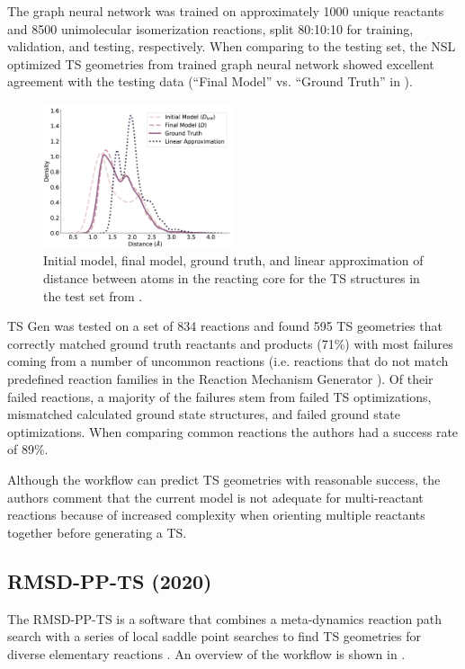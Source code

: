 \documentclass[preprint, 11pt]{elsarticle} %
\begin{document}
The graph neural network was trained on approximately 1000 unique reactants and 8500 unimolecular isomerization reactions, split 80:10:10 for training, validation, and testing, respectively.
When comparing to the testing set, the NSL optimized TS geometries from trained graph neural network showed excellent agreement with the testing data (``Final Model'' vs. ``Ground Truth'' in ). 

\begin{figure}[htbp]
    \centering
    \includegraphics[width=0.5\textwidth]{ml-agreement}
    \caption{Initial model, final model, ground truth, and linear approximation of distance between atoms in the reacting core for the TS structures in the test set from \cite{pattanaik:2020}. }
    \label{fig:ml_agreement}
\end{figure}

TS Gen was tested on a set of 834 reactions and found 595 TS geometries that correctly matched ground truth reactants and products (71\%) with most failures coming from a number of uncommon reactions (i.e. reactions that do not match predefined reaction families in the Reaction Mechanism Generator \cite{gao:2016}).
Of their failed reactions, a majority of the failures stem from failed TS optimizations, mismatched calculated ground state structures, and failed ground state optimizations.
When comparing common reactions the authors had a success rate of 89\%.

Although the workflow can predict TS geometries with reasonable success, the authors comment that the current model is not adequate for multi-reactant reactions because of increased complexity when orienting multiple reactants together before generating a TS.

\subsection{RMSD-PP-TS (2020)}

The RMSD-PP-TS is a software that combines a meta-dynamics reaction path search with a series of local saddle point searches to find TS geometries for diverse elementary reactions \cite{rasmussen:2020}. 
An overview of the workflow is shown in .
\end{document}

